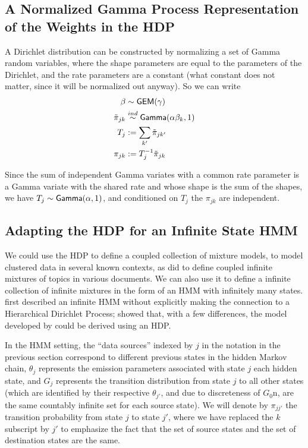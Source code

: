 \subsection{A Normalized Gamma Process Representation of the Weights
  in the HDP}
\label{sec:norm-gamma-proc-1}

A Dirichlet distribution can be constructed by normalizing a set
of Gamma random variables, where the shape parameters are equal to the
parameters of the Dirichlet, and the rate parameters are a constant
(what constant does not matter, since it will be normalized out
anyway).  So we can write
\begin{align}
  \beta &\sim \mathsf{GEM}(\gamma) \\
  \tilde{\pi}_{jk} &\stackrel{ind}{\sim} \mathsf{Gamma}(\alpha \beta_k,1) \\
  T_j &:= \sum_{k'} \tilde{\pi}_{jk'} \\
  \pi_{jk} &:= T_j^{-1} \tilde{\pi}_{jk}
\end{align}

Since the sum of independent Gamma variates with a common rate
parameter is a Gamma variate with the shared rate and whose shape is
the sum of the shapes, we have $T_j \sim \mathsf{Gamma}(\alpha,1)$, and
conditioned on $T_j$ the $\pi_{jk}$ are independent.

\subsection{Adapting the HDP for an Infinite State HMM}

We could use the HDP to define a coupled collection of mixture models,
to model clustered data in several known contexts, as
\citet{teh2006hierarchical} did to define coupled infinite mixtures of
topics in various documents.  We can also use it to define a infinite
collection of infinite mixtures in the form of an HMM with infinitely
many states.  \citet{beal2001infinite} first described an infinite HMM
without explicitly making the connection to a Hierarchical Dirichlet
Process; \citet{teh2006hierarchical} showed that, with a few
differences, the model developed by \citeauthor{beal2001infinite}
could be derived using an HDP.

In the HMM setting, the ``data sources'' indexed by $j$ in the notation in the
previous section correspond to different previous states in the hidden
Markov chain, $\theta_j$ represents the emission parameters
associated with state $j$ each hidden state, and $G_j$ represents the
transition distribution from state $j$ to all other states (which are
identified by their respective $\theta_{j'}$, and due to discreteness
of $G_0$n, are the same countably infinite set for each source
state).  We will denote by $\pi_{jj'}$ the transition probability from
state $j$ to state $j'$, where we have replaced the $k$ subscript by
$j'$ to emphasize the fact that the set of source states and the set
of destination states are the same.

